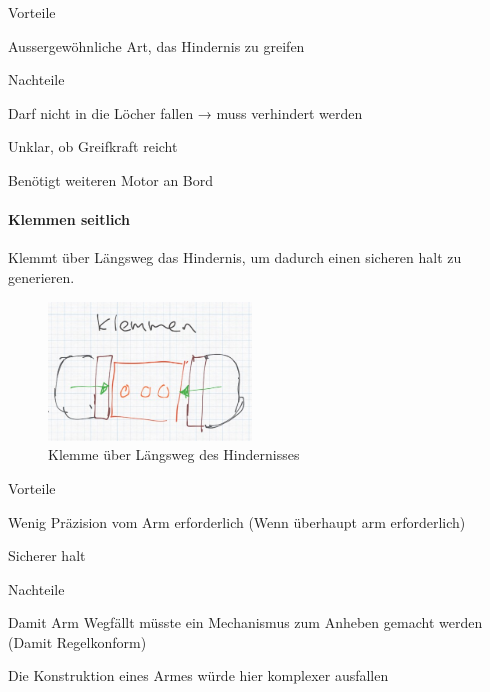 \begin{minipage}[t]{0.48\textwidth}
    \begin{items}
          \item [Vorteile]
          \item Aussergewöhnliche Art, das Hindernis zu greifen
    \end{items}
\end{minipage}
\hfill
\begin{minipage}[t]{0.48\textwidth}
    \begin{items}
          \item [Nachteile]
          \item Darf nicht in die Löcher fallen → muss verhindert werden
          \item Unklar, ob Greifkraft reicht
          \item Benötigt weiteren Motor an Bord
    \end{items}
\end{minipage}
\newpage
\paragraph{Klemmen seitlich}
Klemmt über Längsweg das Hindernis, um dadurch einen sicheren halt zu generieren.

\begin{figure}[h!]
        \centering
        \includegraphics[width=0.48\textwidth]{img/technologierecherche/Aufnahme/Laengsweg_Griff.jpg}
        \caption{Klemme über Längsweg des Hindernisses}
        \label{img:tech_Laengsweg_Griff}
\end{figure}

\begin{minipage}[t]{0.48\textwidth}
    \begin{items}
          \item [Vorteile]
          \item Wenig Präzision vom Arm erforderlich (Wenn überhaupt arm erforderlich)
          \item Sicherer halt
    \end{items}
\end{minipage}
\hfill
\begin{minipage}[t]{0.48\textwidth}
    \begin{items}
          \item [Nachteile]
          \item Damit Arm Wegfällt müsste ein Mechanismus zum Anheben gemacht werden (Damit Regelkonform)
          \item Die Konstruktion eines Armes würde hier komplexer ausfallen 
    \end{items}
\end{minipage}
\newpage
